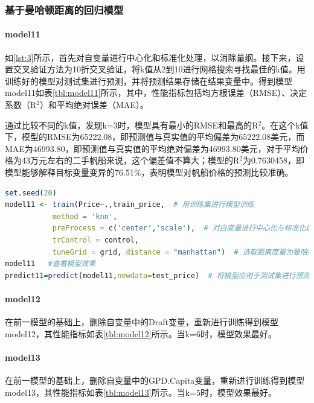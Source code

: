 \documentclass[a4paper,12pt,onecolumn,oneside]{article}
\begin{document}
	\subsubsection{基于曼哈顿距离的回归模型}

	\paragraph{model11}如\ref{lst:3}所示，首先对自变量进行中心化和标准化处理，以消除量纲。接下来，设置交叉验证方法为10折交叉验证，将k值从2到10进行网格搜索寻找最佳的k值。用训练好的模型对测试集进行预测，并将预测结果存储在结果变量中。得到模型model11如表\ref{tbl:model11}所示，其中，性能指标包括均方根误差（RMSE）、决定系数（R$^2$）和平均绝对误差（MAE）。\par 
	通过比较不同的k值，发现k=3时，模型具有最小的RMSE和最高的R$^2$。在这个k值下，模型的RMSE为65222.08，即预测值与真实值的平均偏差为65222.08美元，而MAE为46993.80，即预测值与真实值的平均绝对偏差为46993.80美元，对于平均价格为43万元左右的二手帆船来说，这个偏差值不算大；模型的R$^2$为0.7630458，即模型能够解释目标变量变异的76.51$\%$，表明模型对帆船价格的预测比较准确。
\begin{lstlisting}[language=R, caption={knn回归，曼哈顿距离}, label={lst:3}, belowcaptionskip=0.5\baselineskip]
set.seed(20)
model11 <- train(Price~.,train_price,  # 用训练集进行模型训练
		   method = 'knn',
		   preProcess = c('center','scale'),  # 对自变量进行中心化与标准化以消除量纲
           trControl = control,
           tuneGrid = grid, distance = "manhattan")  # 选取距离度量为曼哈顿距离
model11   #查看模型效果
predict11=predict(model11,newdata=test_price)  # 将模型应用于测试集进行预测
\end{lstlisting}
	\paragraph{model12}在前一模型的基础上，删除自变量中的Draft变量，重新进行训练得到模型model12，其性能指标如表\ref{tbl:model12}所示。当k=6时，模型效果最好。
	\paragraph{model13}在前一模型的基础上，删除自变量中的GPD.Capita变量，重新进行训练得到模型model13，其性能指标如表\ref{tbl:model13}所示。当k=5时，模型效果最好。
\end{document}
